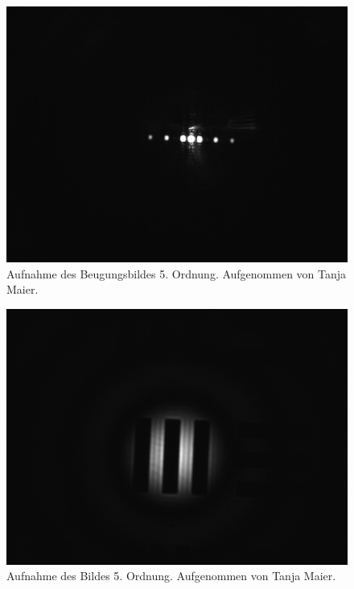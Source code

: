 \documentclass{article}
\begin{document}
\begin{minipage}[t]{.45\textwidth}
\begin{figure}[H]
\includegraphics[scale=0.1]{tm/Beugungsbild_5.jpg}
\caption{Aufnahme des Beugungsbildes 5. Ordnung. Aufgenommen von Tanja Maier.}
\label{fig:bbild_5_tm}
\end{figure}
\end{minipage}
\hfill
\noindent
\begin{minipage}[t]{.45\textwidth}
\begin{figure}[H]
\includegraphics[scale=0.1]{tm/Bild_5.jpg}
\caption{Aufnahme des Bildes 5. Ordnung. Aufgenommen von Tanja Maier.}\label{fig:bild_5_tm}
\end{figure}
\end{minipage}
\end{document}
